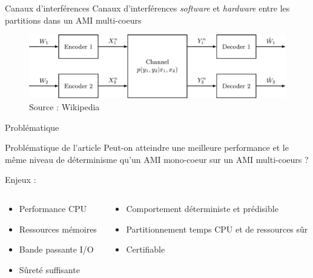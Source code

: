 \documentclass{beamer}
\begin{document}
\begin{frame}{Canaux d'interférences}
	Canaux d'interférences \textit{software} et \textit{hardware} entre les partitions
	dans un AMI multi-coeurs
	\bigskip
	\begin{figure}
		\centering
		\includegraphics[width=\linewidth]{Interference_channel_model.pdf}
		\caption{Source : Wikipedia \cite{wiki:Interference_channel}}
		\label{fig:Interference_channel_model}
	\end{figure}
\end{frame}


\begin{frame}{Problématique} 

	\begin{block}{Problématique de l'article}
	Peut-on atteindre une meilleure performance et le même niveau de déterminisme qu'un AMI mono-coeur sur un 
	AMI multi-coeurs ?
	\end{block}
    \pause
	  Enjeux :
  \begin{columns}
	  \begin{column}{0.45\textwidth}
		  \begin{itemize}
		  	\item Performance CPU 
			\item Ressources mémoires
			\item Bande passante I/O 
			\item Sûreté suffisante
		  \end{itemize}
	  \end{column}
	  \begin{column}{0.45\textwidth}
		  \begin{itemize}
			  \item Comportement déterministe et prédisible
		      \item Partitionnement temps CPU et de ressources sûr
			  \item Certifiable
		  \end{itemize}
	  \end{column}
  \end{columns}
 
\end{frame}
\end{document}

